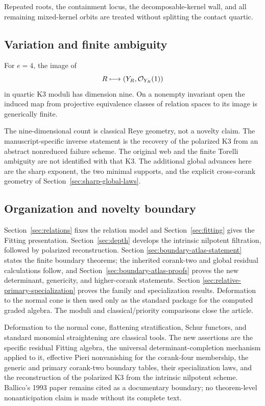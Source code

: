 Repeated roots, the containment locus, the decomposable-kernel wall,
and all remaining mixed-kernel orbits are treated without splitting
the contact quartic.

\subsection{Variation and finite ambiguity}

\begin{theorem}
\label{thm:main-moduli}
For \(e=4\), the image of
\[
 R\longmapsto(Y_R,\mathcal O_{Y_R}(1))
\]
in quartic K3 moduli has dimension nine.  On a nonempty invariant
open the induced map from projective equivalence classes of relation
spaces to its image is generically finite.
\end{theorem}

The nine-dimensional count is classical Reye geometry, not a novelty
claim.  The manuscript-specific inverse statement is the recovery of
the polarized K3 from an abstract nonreduced failure scheme.  The original
web and the finite Torelli ambiguity are not identified with that K3.
The additional global advances here are the sharp exponent, the two
minimal supports, and the explicit cross-corank geometry of
Section~\ref{sec:sharp-global-laws}.

\subsection{Organization and novelty boundary}

Section~\ref{sec:relations} fixes the relation model and
Section~\ref{sec:fitting} gives the Fitting presentation.
Section~\ref{sec:depth} develops the intrinsic nilpotent filtration,
followed by polarized reconstruction.  Section
\ref{sec:boundary-atlas-statement} states the finite boundary theorems;
the inherited corank-two and global residual calculations follow, and
Section~\ref{sec:boundary-atlas-proofs} proves the new determinant,
genericity, and higher-corank statements.  Section
\ref{sec:relative-primary-specialization} proves the family and
specialization results.  Deformation to the normal cone is then used
only as the standard package for the computed graded algebra.  The
moduli and classical/priority comparisons close the article.

Deformation to the normal cone, flattening stratification, Schur
functors, and standard monomial straightening are classical tools.
The new assertions are the specific residual Fitting algebra, the
universal determinant-completion mechanism applied to it, effective
Pieri nonvanishing for the corank-four membership, the generic and
primary corank-two boundary tables, their specialization laws, and
the reconstruction of the polarized K3 from the intrinsic nilpotent
scheme.  Ballico's 1993 paper remains cited as a documentary boundary;
no theorem-level nonanticipation claim is made without its complete
text.
